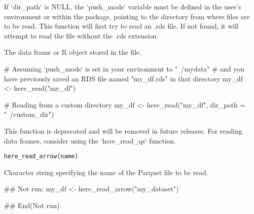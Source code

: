 \documentclass[a4paper]{book}
\begin{document}
%
\begin{Details}
If `dir\_path` is NULL, the `push\_mods` variable must be defined in the user's environment or within the package, pointing to the directory from where files are to be read.
This function will first try to read an .rds file. If not found, it will attempt to read the file without the .rds extension.
\end{Details}
%
\begin{Value}
The data frame or R object stored in the file.
\end{Value}
%
\begin{Examples}
\begin{ExampleCode}
# Assuming `push_mods` is set in your environment to "~/mydata"
# and you have previously saved an RDS file named "my_df.rds" in that directory
my_df <- here_read("my_df")

# Reading from a custom directory
my_df <- here_read("my_df", dir_path = "~/custom_dir")

\end{ExampleCode}
\end{Examples}
%
\begin{Description}
This function is deprecated and will be removed in future releases.
For reading data frames, consider using the `here\_read\_qs` function.
\end{Description}
%
\begin{Usage}
\begin{verbatim}
here_read_arrow(name)
\end{verbatim}
\end{Usage}
%
\begin{Arguments}
\begin{ldescription}
\item[\code{name}] Character string specifying the name of the Parquet file to be read.
\end{ldescription}
\end{Arguments}
%
\begin{Examples}
\begin{ExampleCode}
## Not run: 
my_df <- here_read_arrow("my_dataset")

## End(Not run)

\end{ExampleCode}
\end{Examples}
\end{document}
